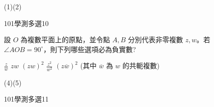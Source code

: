 \begin{QUESTIONS}
\begin{QUESTION}
\begin{QBODY}
        \end{QBODY}
        \begin{QFROMS}
        \end{QFROMS}
        \begin{QTAGS}\end{QTAGS}
        \begin{QANS}
            (1)(2)
        \end{QANS}
        \begin{QSOLLIST}
        \end{QSOLLIST}
        \begin{QEMPTYSPACE}
        \end{QEMPTYSPACE}
    \end{QUESTION}
    \begin{QUESTION}
        \begin{ExamInfo}{101}{學測}{多選}{10}
        \end{ExamInfo}
        \begin{ExamAnsRateInfo}{36}{66}{27}{15}
        \end{ExamAnsRateInfo}
        \begin{QBODY}
		設 $O$ 為複數平面上的原點，並令點 $A,B$ 分別代表非零複數 $z,w$。若 $\angle AOB = 90^\circ$，則下列哪些選項必為負實數?
		\begin{QOPS} 
			\QOP $\frac{z}{w}$    
			\QOP $zw$    
			\QOP $(zw)^2$ 
			\QOP $\frac{z^2}{w^2}$ 
			\QOP $(z\overline{w})^2$ (其中 $\overline{w}$ 為 $w$ 的共軛複數)
		\end{QOPS}
        \end{QBODY}
        \begin{QFROMS}
        \end{QFROMS}
        \begin{QTAGS}\end{QTAGS}
        \begin{QANS}
            (4)(5)
        \end{QANS}
        \begin{QSOLLIST}
        \end{QSOLLIST}
        \begin{QEMPTYSPACE}
        \end{QEMPTYSPACE}
    \end{QUESTION}
    \begin{QUESTION}
        \begin{ExamInfo}{101}{學測}{多選}{11}
        \end{ExamInfo}
        \begin{ExamAnsRateInfo}{37}{62}{29}{20}

\end{ExamAnsRateInfo}
\end{QUESTION}
\end{QUESTIONS}
